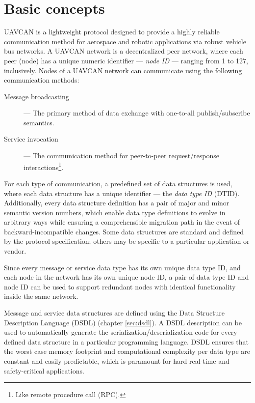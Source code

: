 \chapter{Basic concepts}\label{sec:basic_concepts}

UAVCAN is a lightweight protocol designed to provide a highly reliable communication method for
aerospace and robotic applications via robust vehicle bus networks.
A UAVCAN network is a decentralized peer network, where each peer (node) has a unique
numeric identifier --- \emph{node ID} --- ranging from 1 to 127, inclusively.
Nodes of a UAVCAN network can communicate using the following communication methods:
\begin{description}
    \item[Message broadcasting] --- The primary method of data exchange with one-to-all publish/subscribe semantics.
    \item[Service invocation] --- The communication method for peer-to-peer request/response
    interactions\footnote{Like remote procedure call (RPC).}.
\end{description}

For each type of communication, a predefined set of data structures is used,
where each data structure has a unique identifier --- the \emph{data type ID} (DTID).
Additionally, every data structure definition has a pair of major and minor semantic version numbers,
which enable data type definitions to evolve in arbitrary ways while ensuring a comprehensible
migration path in the event of backward-incompatible changes.
Some data structures are standard and defined by the protocol specification;
others may be specific to a particular application or vendor.

Since every message or service data type has its own unique data type ID,
and each node in the network has its own unique node ID,
a pair of data type ID and node ID can be used to support redundant nodes with identical
functionality inside the same network.

Message and service data structures are defined using the Data Structure Description Language
(DSDL) (chapter \ref{sec:dsdl}).
A DSDL description can be used to automatically generate the serialization/deserialization code
for every defined data structure in a particular programming language.
DSDL ensures that the worst case memory footprint and computational complexity per data type
are constant and easily predictable, which is paramount for hard real-time and safety-critical applications.

